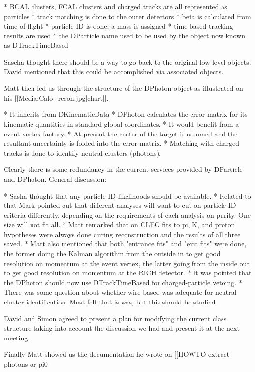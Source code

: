 \documentclass[xcolor=dvipsnames]{beamer}
\begin{document}
{* BCAL clusters, FCAL clusters and charged tracks are all represented as particles
* track matching is done to the outer detectors
* beta is calculated from time of flight
* particle ID is done; a mass is assigned
* time-based tracking results are used
* the DParticle name used to be used by the object now known as DTrackTimeBased

Sascha thought there should be a way to go back to the original low-level objects. David mentioned that this could be accomplished via associated objects.

Matt then led us through the structure of the DPhoton object as illustrated on his [[Media:Calo_recon.jpg|chart]].

* It inherits from DKinematicData
* DPhoton calculates the error matrix for its kinematic quantities in standard global coordinates.
* It would benefit from a event vertex factory.
* At present the center of the target is assumed and the resultant uncertainty is folded into the error matrix.
* Matching with charged tracks is done to identify neutral clusters (photons).

Clearly there is some redundancy in the current services provided by DParticle and DPhoton. General discussion:

* Sasha thought that any particle ID likelihoods should be available.
* Related to that Mark pointed out that different analyses will want to cut on particle ID criteria differently, depending on the requirements of each analysis on purity. One size will not fit all.
* Matt remarked that on CLEO fits to pi, K, and proton hypotheses were always done during reconstruction and the results of all three saved.
* Matt also mentioned that both "entrance fits" and "exit fits" were done, the former doing the Kalman algorithm from the outside in to get good resolution on momentum at the event vertex, the latter going from the inside out to get good resolution on momentum at the RICH detector.
* It was pointed that the DPhoton should now use DTrackTimeBased for charged-particle vetoing.
* There was some question about whether wire-based was adequate for neutral cluster identification. Most felt that is was, but this should be studied.

David and Simon agreed to present a plan for modifying the current class structure taking into account the discussion we had and present it at the next meeting.

Finally Matt showed us the documentation he wrote on [[HOWTO extract photons or pi0%

}
\end{document}
